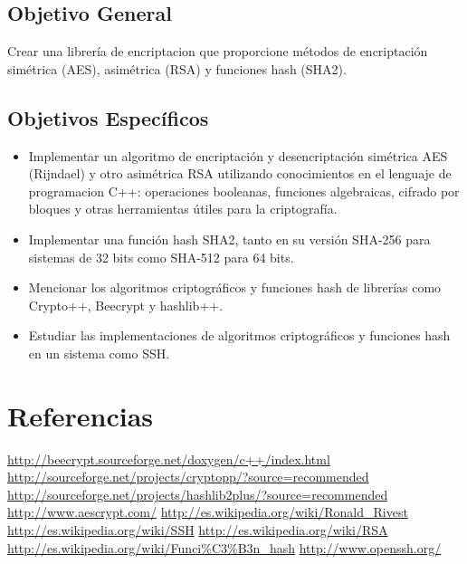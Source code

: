 \documentclass[spanish]{article}
\begin{document}
\subsection{Objetivo General}
Crear una librería de encriptacion que proporcione métodos de encriptación simétrica (AES), asimétrica (RSA) y funciones hash (SHA2). 

\subsection{Objetivos Específicos}
\begin{itemize}
\item Implementar un algoritmo de encriptación y desencriptación simétrica AES (Rijndael) y otro asimétrica RSA utilizando conocimientos en el lenguaje de programacion C++: operaciones booleanas, funciones algebraicas, cifrado por bloques y otras herramientas útiles para la criptografía.
\item Implementar una función hash SHA2, tanto en su versión SHA-256 para sistemas de 32 bits como SHA-512 para 64 bits.
\item Mencionar los algoritmos criptográficos y funciones hash de librerías como Crypto++, Beecrypt y hashlib++.
\item Estudiar las implementaciones de algoritmos criptográficos y funciones hash en un sistema como SSH.
\end{itemize}

\section{Referencias}
\begin{thebibliography}{9}

\bibitem{}\url{http://beecrypt.sourceforge.net/doxygen/c++/index.html}
\bibitem{}\url{http://sourceforge.net/projects/cryptopp/?source=recommended}
\bibitem{}\url{http://sourceforge.net/projects/hashlib2plus/?source=recommended}
\bibitem{}\url{http://www.aescrypt.com/}
\bibitem{}\url{http://es.wikipedia.org/wiki/Ronald_Rivest}
\bibitem{}\url{http://es.wikipedia.org/wiki/SSH}
\bibitem{}\url{http://es.wikipedia.org/wiki/RSA}
\bibitem{}\url{http://es.wikipedia.org/wiki/Funci%C3%B3n_hash}
\bibitem{}\url{http://www.openssh.org/}


\end{thebibliography}
\end{document}
